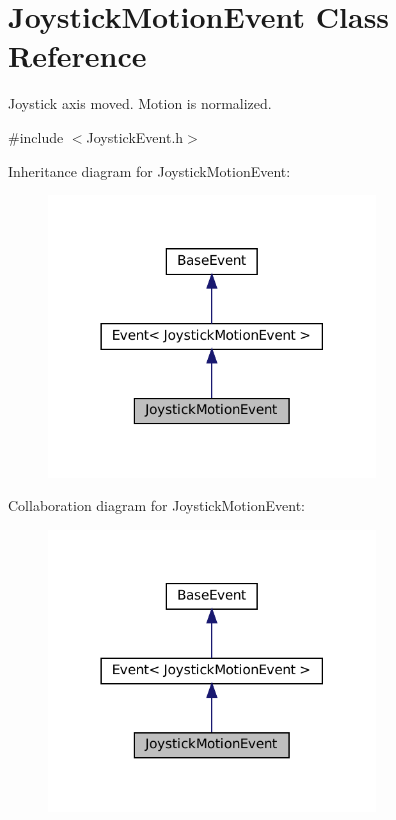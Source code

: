 \hypertarget{classJoystickMotionEvent}{}\section{Joystick\+Motion\+Event Class Reference}
\label{classJoystickMotionEvent}


Joystick axis moved. Motion is normalized.  




{\ttfamily \#include $<$Joystick\+Event.\+h$>$}



Inheritance diagram for Joystick\+Motion\+Event\+:
\nopagebreak
\begin{figure}[H]
\begin{center}
\leavevmode
\includegraphics[width=246pt]{classJoystickMotionEvent__inherit__graph}
\end{center}
\end{figure}


Collaboration diagram for Joystick\+Motion\+Event\+:
\nopagebreak
\begin{figure}[H]
\begin{center}
\leavevmode
\includegraphics[width=246pt]{classJoystickMotionEvent__coll__graph}
\end{center}
\end{figure}
